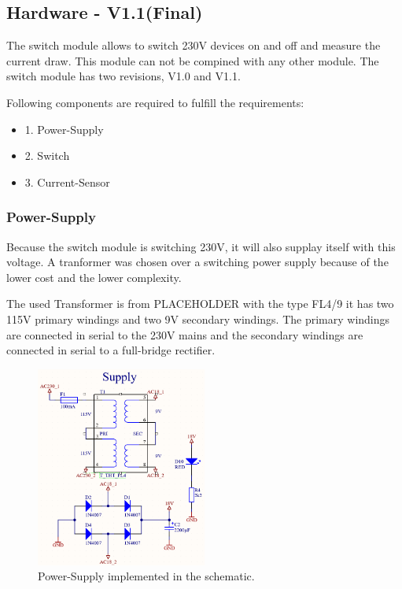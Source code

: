 \subsection{Hardware - V1.1(Final)}

    The switch module allows to switch 230V devices on and off and measure the current draw. 
    This module can not be compined with any other module. The switch module has two revisions,
    V1.0 and V1.1.

    Following components are required to fulfill the requirements:

    \begin{itemize}
        \item 1. Power-Supply
        \item 2. Switch
        \item 3. Current-Sensor
     
    \end{itemize}

    \subsubsection{Power-Supply}

        Because the switch module is switching 230V, it will also supplay itself with this voltage.
        A tranformer was chosen over a switching power supply because of the lower cost and the
        lower complexity.

        The used Transformer is from PLACEHOLDER with the type FL4/9 it has two 115V primary windings and
        two 9V secondary windings. The primary windings are connected in serial to the 230V mains and the
        secondary windings are connected in serial to a full-bridge rectifier. 

        \begin{figure}[H]
            \centering
            \includegraphics[width=0.5\textwidth]{assets/HW/Power-Supply-schematic.png}
            \caption{Power-Supply implemented in the schematic.}
        \end{figure}
        
